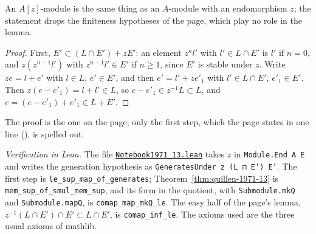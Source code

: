 \noindent An $A[z]$-module is the same thing as an $A$-module with an endomorphism $z$; the statement drops the finiteness hypotheses of the page, which play no role in the lemma.

\begin{proof}
First, $E' \subset (L \cap E') + zE'$: an element $z^n l'$ with $l' \in L \cap E'$ is $l'$ if $n = 0$, and $z(z^{n-1}l')$ with $z^{n-1} l' \in E'$ if $n \ge 1$, since $E'$ is stable under $z$. Write $ze = l + e'$ with $l \in L$, $e' \in E'$, and then $e' = l' + z e'_1$ with $l' \in L \cap E'$, $e'_1 \in E'$. Then $z(e - e'_1) = l + l' \in L$, so $e - e'_1 \in z^{-1}L \subset L$, and $e = (e - e'_1) + e'_1 \in L + E'$.
\end{proof}

\noindent The proof is the one on the page; only the first step, which the page states in one line (), is spelled out.

\emph{Verification in Lean.} The file \href{\leanblobmain/Notebook1971_13.lean}{\texttt{Notebook1971\_13.\allowbreak{}lean}} takes $z$ in \texttt{Module.End A E} and writes the generation hypothesis as \texttt{GeneratesUnder z (L ⊓ E') E'}. The first step is \texttt{le\_sup\_map\_of\_generates}; Theorem~\ref{thm:quillen-1971-13} is \texttt{mem\_sup\_of\_smul\_mem\_sup}, and its form in the quotient, with \texttt{Submodule.mkQ} and \texttt{Submodule.mapQ}, is \texttt{comap\_map\_mkQ\_le}. The easy half of the page's lemma, $z^{-1}(L \cap E') \cap E' \subset L \cap E'$, is \texttt{comap\_inf\_le}. The axioms used are the three usual axioms of mathlib.

